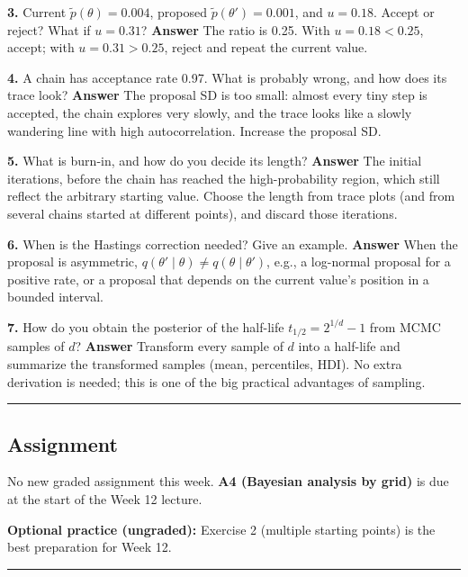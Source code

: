 \textbf{3.} Current \(\tilde p(\theta) = 0.004\), proposed
\(\tilde p(\theta') = 0.001\), and \(u = 0.18\). Accept or reject? What
if \(u = 0.31\)? \textbf{Answer} The ratio is 0.25. With
\(u = 0.18 < 0.25\), accept; with \(u = 0.31 > 0.25\), reject and repeat
the current value.

\textbf{4.} A chain has acceptance rate 0.97. What is probably wrong,
and how does its trace look? \textbf{Answer} The proposal SD is too
small: almost every tiny step is accepted, the chain explores very
slowly, and the trace looks like a slowly wandering line with high
autocorrelation. Increase the proposal SD.

\textbf{5.} What is burn-in, and how do you decide its length?
\textbf{Answer} The initial iterations, before the chain has reached the
high-probability region, which still reflect the arbitrary starting
value. Choose the length from trace plots (and from several chains
started at different points), and discard those iterations.

\textbf{6.} When is the Hastings correction needed? Give an example.
\textbf{Answer} When the proposal is asymmetric,
\(q(\theta'\mid\theta) \ne q(\theta\mid\theta')\), e.g., a log-normal
proposal for a positive rate, or a proposal that depends on the current
value's position in a bounded interval.

\textbf{7.} How do you obtain the posterior of the half-life
\(t_{1/2} = 2^{1/d} - 1\) from MCMC samples of \(d\)? \textbf{Answer}
Transform every sample of \(d\) into a half-life and summarize the
transformed samples (mean, percentiles, HDI). No extra derivation is
needed; this is one of the big practical advantages of sampling.

\begin{center}\rule{0.5\linewidth}{0.5pt}\end{center}

\subsection{Assignment}

No new graded assignment this week. \textbf{A4 (Bayesian analysis by
grid)} is due at the start of the Week 12 lecture.

\textbf{Optional practice (ungraded):} Exercise 2 (multiple starting
points) is the best preparation for Week 12.

\begin{center}\rule{0.5\linewidth}{0.5pt}\end{center}

